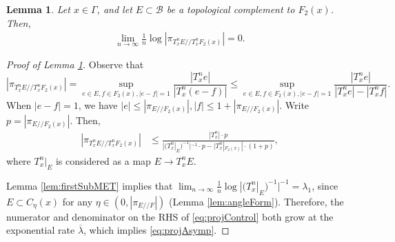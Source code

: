 \documentclass[11pt]{amsart}
\theoremstyle{theorem}
\newtheorem{lem}[thm]{Lemma}
\theoremstyle{definition}
\numberwithin{equation}{section}
\renewcommand{\l}{\lambda}
\newcommand{\Bc}{\mathcal{B}}
\newcommand{\ds}{/ \! /}
\newcommand{\ol}{\overline{\lambda}}
\begin{document}
\begin{lem}\label{lem:compAngle}
Let $x \in \Gamma$, and let $E \subset \Bc$ be a topological complement to $F_2(x)$. Then,
\begin{align}\label{eq:projAsymp}
\lim_{n \to \infty} \frac{1}{n} \log |\pi_{T^n_x E \ds T^n_x F_2(x)} | = 0.
\end{align}
\end{lem}
\begin{proof}[Proof of Lemma \ref{lem:compAngle}]

Observe that
\[
|\pi_{T^n_x E \ds T^n_x F_2(x)}| = \sup_{e \in E, f \in F_2(x), |e - f| = 1} \frac{|T^n_x e|}{|T^n_x (e -f)|} \leq \sup_{e \in E, f \in F_2(x), |e - f| = 1} \frac{|T^n_x e|}{|T^n_x e| -|T^n_x f|}.
\]
When $|e - f| = 1$, we have $|e| \leq |\pi_{E \ds F_2(x)}|, |f| \leq  1 +  |\pi_{E \ds F_2(x)}|$. Write $p = |\pi_{E \ds F_2(x)}|$. Then,
\begin{align}\label{eq:projControl}
|\pi_{T^n_x E \ds T^n_x F_2(x)}| & \leq  \frac{|T^n_x | \cdot p}{|(T^n_x|_E)^{-1}|^{-1} \cdot p -|T^n_x |_{F_2(x)}| \cdot (1 +  p)},
\end{align}
where $T^n_x|_E$ is considered as a map $E \to T^n_x E$.

Lemma \ref{lem:firstSubMET} implies that $\lim_{n \to \infty} \frac{1}{n} \log |(T^n_x|_E)^{-1}|^{-1} = \l_1$, since $E \subset C_{\eta}(x)$ for any $\eta \in (0, |\pi_{E \ds F}|)$ (Lemma \ref{lem:angleForm}). Therefore, the numerator and denominator on the RHS of \eqref{eq:projControl} both grow at the exponential rate $\ol$, which implies \eqref{eq:projAsymp}.
\end{proof}
\end{document}
